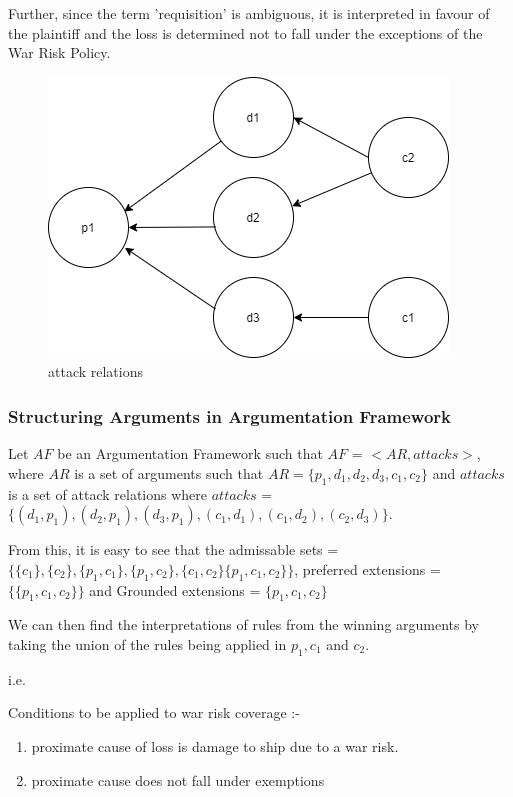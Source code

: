Further, since the term 'requisition' is ambiguous, it is interpreted in favour of the plaintiff and the loss is determined not to fall under the exceptions of the War Risk Policy. 

\begin{figure}
    \centering
    \includegraphics[scale=0.8]{figures/attack_relations.png}
    \caption{attack relations}
    \label{fig:attack relations}
\end{figure}

\subsubsection{Structuring Arguments in Argumentation Framework}

Let $AF$ be an Argumentation Framework \cite{dung1995} such that $AF$ = $<AR, attacks>$, 
where $AR$ is a set of arguments such that $AR = \{p_1, d_1, d_2, d_3, c_1, c_2\}$ and $attacks$ is a set of attack relations where $attacks$ = $\{(d_1, p_1), (d_2, p_1), (d_3, p_1), (c_1, d_1), (c_1, d_2), (c_2, d_3)\}$.

From this, it is easy to see that the admissable sets = $\{\{c_1\}, \{c_2\}, \{p_1, c_1\}, \{p_1, c_2\}, \{c_1, c_2\} \{p_1, c_1, c_2\}\}$, preferred extensions = $\{\{p_1, c_1, c_2\}\}$ and Grounded extensions = $\{p_1, c_1, c_2\}$

We can then find the interpretations of rules from the winning arguments by taking the union of the rules being applied in $p_1, c_1$ and $ c_2$.

i.e.

     Conditions to be applied to war risk coverage :-
    \begin{enumerate}
        \item proximate cause of loss is damage to ship due to a war risk.
        \item proximate cause does not fall under exemptions
    \end{enumerate}
    

